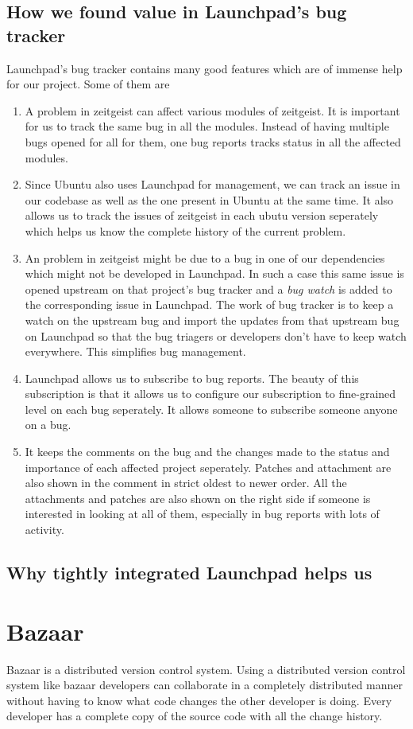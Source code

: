 \subsection{How we found value in Launchpad's bug tracker}
Launchpad's bug tracker contains many good features which are of immense help for our 
project. Some of them are
\begin{enumerate}
\item A problem in zeitgeist can affect various modules of zeitgeist. It is important for 
us to track the same bug in all the modules. Instead of having multiple bugs opened for 
all for them, one bug reports tracks status in all the affected modules.
\item Since Ubuntu also uses Launchpad for management, we can track an issue in our codebase 
as well as the one present in Ubuntu at the same time. It also allows us to track the issues 
of zeitgeist in each ubutu version seperately which helps us know the complete history 
of the current problem.
\item An problem in zeitgeist might be due to a bug in one of our dependencies which might 
not be developed in Launchpad. In such a case this same issue is opened upstream on that 
project's bug tracker and a \textit{bug watch} is added to the corresponding issue in Launchpad. 
The work of bug tracker is to keep a watch on the upstream bug and import the updates from that 
upstream bug on Launchpad so that the bug triagers or developers don't have to keep watch 
everywhere. This simplifies bug management.
\item Launchpad allows us to subscribe to bug reports. The beauty of this subscription is that 
it allows us to configure our subscription to fine-grained level on each bug seperately. It 
allows someone to subscribe someone anyone on a bug.
\item It keeps the comments on the bug and the changes made to the status and importance of 
each affected project seperately. Patches and attachment are also shown in the comment in 
strict oldest to newer order. All the attachments and patches are also shown on the right 
side if someone is interested in looking at all of them, especially in bug reports with lots 
of activity.
\end{enumerate}
\subsection{Why tightly integrated Launchpad helps us}

\section{Bazaar}
Bazaar is a distributed version control system. Using a distributed version control 
system like bazaar developers can collaborate in a completely distributed manner 
without having to know what code changes the other developer is doing. Every developer 
has a complete copy of the source code with all the change history.

